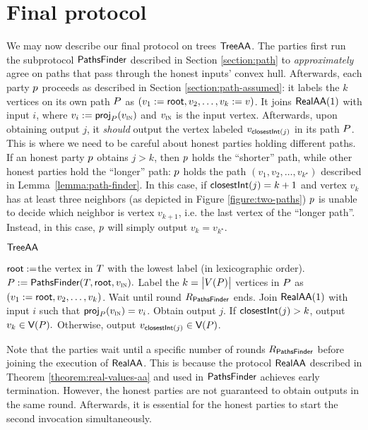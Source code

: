 \section{Final protocol}
We may now describe our final protocol on trees $\textsf{TreeAA}$. The parties first run the subprotocol $\textsf{PathsFinder}$ described in Section \ref{section:path} to \emph{approximately} agree on paths that pass through the honest inputs' convex hull. 
Afterwards, each party $p$ proceeds as described in Section \ref{section:path-assumed}: it labels the $k$ vertices on its own path $P$ as $(v_1 := \textsf{root}, v_2, \ldots, v_k := v)$. It joins $\textsf{RealAA}(1)$ with input $i$, where $v_i := \textsf{proj}_{P}(v_{\textsc{in}})$ and $v_{\textsc{in}}$
is the input vertex. 
Afterwards, upon obtaining output $j$, it \emph{should} output the vertex labeled $v_{\textsf{closestInt}(j)}$ in its path $P$. This is where we need to be careful about honest parties holding different paths. 
If an honest party $p$ obtains $j > k$, then $p$ holds the ``shorter'' path, while other honest parties hold the ``longer'' path: $p$ holds the path $(v_1, v_2, \ldots, v_{k^\star})$ described in Lemma~\ref{lemma:path-finder}. 
In this case, if $\textsf{closestInt}(j) = k + 1$ and vertex $v_k$ has at least three neighbors (as depicted in Figure \ref{figure:two-paths}) $p$ is unable to decide which neighbor is vertex $v_{k + 1}$, i.e. the last vertex of the ``longer path''. Instead, in this case, $p$ will simply output $v_k = v_{k^\star}$. 

\begin{dianabox}{$\textsf{TreeAA}$}
	\begin{algorithmic}[1]
            \State $\textsf{root} := $the vertex in $T$ with the lowest label (in lexicographic order).
            \State  $P := \textsf{PathsFinder}(T, \textsf{root}, v_{\textsc{in}}).$ Label the $k = \big\lvert V(P)\big\rvert$ vertices in $P$ as $(v_1 := \textsf{root}, v_2, \ldots, v_k)$.
            \State Wait until round $R_{\textsf{PathsFinder}}$ ends.
            \State Join $\textsf{RealAA}(1)$ with input $i$ such that $\textsf{proj}_{P}(v_{\textsc{in}}) = v_i$. Obtain output $j$.
            \State If $\textsf{closestInt}(j) > k$, output $v_{k} \in \textsf{V}(P).$ Otherwise, output $v_{\textsf{closestInt}(j)} \in \textsf{V}(P)$.
    \end{algorithmic}
\end{dianabox}

Note that the parties wait until a specific number of rounds $R_{\textsf{PathsFinder}}$ before joining the execution of $\textsf{RealAA}$. This is because the protocol  $\textsf{RealAA}$ described in Theorem \ref{theorem:real-values-aa} and used in $\textsf{PathsFinder}$ achieves early termination. However, the honest parties are not guaranteed to obtain outputs in the same round. Afterwards, it is essential for the honest parties to start the second invocation simultaneously.

